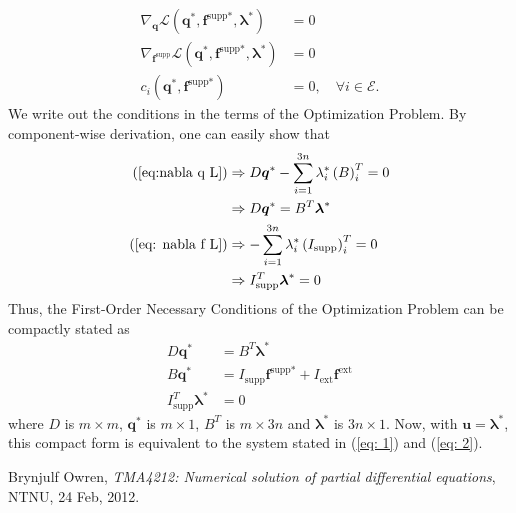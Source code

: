 \documentclass[10pt,a4paper]{article}
\begin{document}
\begin{align}
\nabla_{\boldsymbol{q}}\mathcal{L}\left(\boldsymbol{q}^*,\boldsymbol{f}^\text{supp*},\boldsymbol{\lambda}^*\right) &= 0 \label{eq:nabla q L} \\
\nabla_{\boldsymbol{f}^\text{supp}}\mathcal{L}\left(\boldsymbol{q}^*,\boldsymbol{f}^\text{supp*},\boldsymbol{\lambda}^*\right) &= 0 \label{eq: nabla f L} \\
c_i\left(\boldsymbol{q}^*,\boldsymbol{f}^\text{supp*}\right) &= 0, \quad \forall i \in \mathcal{E}. \label{eq: ci=0 all i in E}
\end{align}
We write out the conditions in the terms of the Optimization Problem. By component-wise derivation, one can easily show that
\begin{align*}
\left(\ref{eq:nabla q L}\right) &\Rightarrow D\boldsymbol{q}^* - \sum_{i=1}^{3n}\lambda_i^*\left(B\right)_i^T = 0 \\
 &\Rightarrow D\boldsymbol{q}^* = B^T\boldsymbol{\lambda}^* \\
\left(\ref{eq: nabla f L}\right) &\Rightarrow -\sum_{i=1}^{3n}\lambda_i^*\left(I_\text{supp}\right)_i^T = 0 \\
 &\Rightarrow I_\text{supp}^T\boldsymbol{\lambda}^* = 0
\end{align*}
Thus, the First-Order Necessary Conditions of the Optimization Problem can be compactly stated as 
\begin{align*}
D\boldsymbol{q}^* &= B^T\boldsymbol{\lambda}^* \\
B\boldsymbol{q}^* &= I_\text{supp}\boldsymbol{f}^\text{supp*} + I_\text{ext}\boldsymbol{f}^\text{ext}\\
I_\text{supp}^T\boldsymbol{\lambda}^* &= 0
\end{align*} 
where $D$ is $m\times m$, $\boldsymbol{q}^*$ is $m\times 1$, $B^T$ is $m\times 3n$ and $\boldsymbol{\lambda}^*$ is $3n \times 1$. Now, with $\boldsymbol{u} = \boldsymbol{\lambda}^*$, this compact form is equivalent to the system stated in (\ref{eq: 1}) and (\ref{eq: 2}).



\begin{thebibliography}{2}
Brynjulf Owren, \emph{TMA4212: Numerical solution of partial differential equations}, NTNU, 24 Feb, 2012.
\end{thebibliography}
\end{document}
